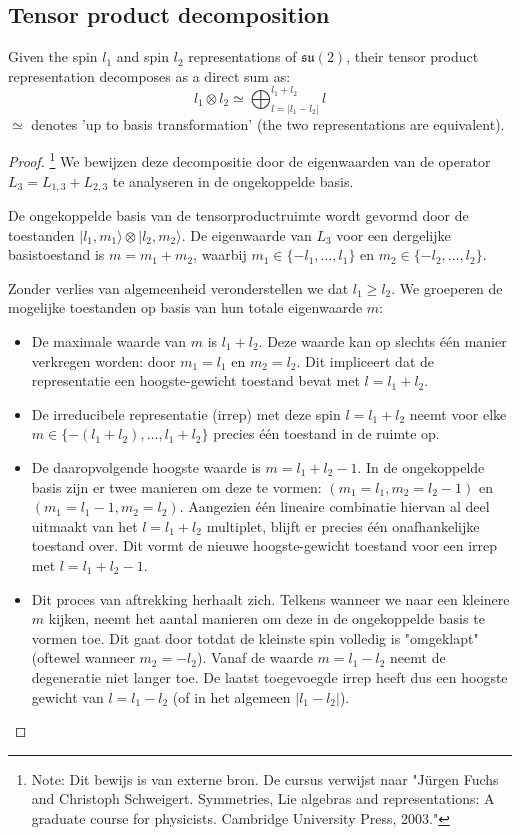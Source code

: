 \subsection{Tensor product decomposition}

\begin{theorem}
    Given the spin \(l_1\) and spin \(l_2\) representations of \(\mathfrak{su}(2)\), their tensor product representation decomposes as a direct sum as:
    \[
    l_1 \otimes l_2  \simeq \bigoplus_{l = |l_1 - l_2|}^{l_1 + l_2} l
    \]
    \(\simeq\) denotes 'up to basis transformation' (the two representations are equivalent).
\end{theorem}
\begin{proof} \footnote{Note: Dit bewijs is van externe bron. De cursus verwijst naar "Jürgen Fuchs and Christoph Schweigert. Symmetries, Lie algebras and representations: A graduate course for physicists. Cambridge University Press, 2003."}
    We bewijzen deze decompositie door de eigenwaarden van de operator $L_3 = L_{1,3} + L_{2,3}$ te analyseren in de ongekoppelde basis.

    De ongekoppelde basis van de tensorproductruimte wordt gevormd door de toestanden $|l_1, m_1\rangle \otimes |l_2, m_2\rangle$. De eigenwaarde van $L_3$ voor een dergelijke basistoestand is $m = m_1 + m_2$, waarbij $m_1 \in \{-l_1, \dots, l_1\}$ en $m_2 \in \{-l_2, \dots, l_2\}$.

    Zonder verlies van algemeenheid veronderstellen we dat $l_1 \ge l_2$. We groeperen de mogelijke toestanden op basis van hun totale eigenwaarde $m$:
    \begin{itemize}
        \item De maximale waarde van $m$ is $l_1 + l_2$. Deze waarde kan op slechts \'{e}\'{e}n manier verkregen worden: door $m_1 = l_1$ en $m_2 = l_2$. Dit impliceert dat de representatie een hoogste-gewicht toestand bevat met $l = l_1 + l_2$.
        \item De irreducibele representatie (irrep) met deze spin $l = l_1 + l_2$ neemt voor elke $m \in \{-(l_1+l_2), \dots, l_1+l_2\}$ precies \'{e}\'{e}n toestand in de ruimte op.
        \item De daaropvolgende hoogste waarde is $m = l_1 + l_2 - 1$. In de ongekoppelde basis zijn er twee manieren om deze te vormen: $(m_1 = l_1, m_2 = l_2 - 1)$ en $(m_1 = l_1 - 1, m_2 = l_2)$. Aangezien \'{e}\'{e}n lineaire combinatie hiervan al deel uitmaakt van het $l = l_1 + l_2$ multiplet, blijft er precies \'{e}\'{e}n onafhankelijke toestand over. Dit vormt de nieuwe hoogste-gewicht toestand voor een irrep met $l = l_1 + l_2 - 1$.
        \item Dit proces van aftrekking herhaalt zich. Telkens wanneer we naar een kleinere $m$ kijken, neemt het aantal manieren om deze in de ongekoppelde basis te vormen toe. Dit gaat door totdat de kleinste spin volledig is "omgeklapt" (oftewel wanneer $m_2 = -l_2$). Vanaf de waarde $m = l_1 - l_2$ neemt de degeneratie niet langer toe. De laatst toegevoegde irrep heeft dus een hoogste gewicht van $l = l_1 - l_2$ (of in het algemeen $|l_1 - l_2|$).
    \end{itemize}


\end{proof}
